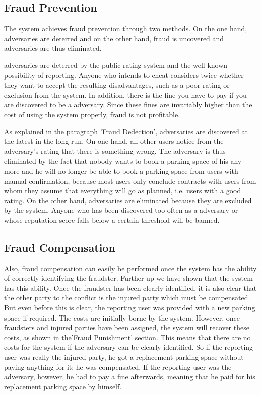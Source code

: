 \documentclass[
a4paper,     %
titlepage,   %
14pt         %
]{scrartcl}  %
\theoremstyle{mystyle}
\begin{document}
\subsection{Fraud Prevention}
The system achieves fraud prevention through two methods. On the one hand, adversaries are deterred and on the other hand, fraud is uncovered and adversaries are thus eliminated.

adversaries are deterred by the public rating system and the well-known possibility of reporting. Anyone who intends to cheat considers twice whether they want to accept the resulting disadvantages, such as a poor rating or exclusion from the system. In addition, there is the fine you have to pay if you are discovered to be a adversary. Since these fines are invariably higher than the cost of using the system properly, fraud is not profitable.

As explained in the paragraph 'Fraud Dedection', adversaries are discovered at the latest in the long run. On one hand, all other users notice from the adversary's rating that there is something wrong. The adversary is thus eliminated by the fact that nobody wants to book a parking space of his any more and he will no longer be able to book a parking space from users with manual confirmation, because most users only conclude contracts with users from whom they assume that everything will go as planned, i.e. users with a good rating. On the other hand, adversaries are eliminated because they are excluded by the system. Anyone who has been discovered too often as a adversary or whose reputation score falls below a certain threshold will be banned.

\subsection{Fraud Compensation}
Also, fraud compensation can easily be performed once the system has the ability of correctly identifying the fraudster. Further up we have shown that the system has this ability. Once the fraudster has been clearly identified, it is also clear that the other party to the conflict is the injured party which must be compensated. \\

But even before this is clear, the reporting user was provided with a new parking space if required. The costs are initially borne by the system. However, once fraudsters and injured parties have been assigned, the system will recover these costs, as shown in the'Fraud Punishment' section. This means that there are no costs for the system if the adversary can be clearly identified. So if the reporting user was really the injured party, he got a replacement parking space without paying anything for it; he was compensated. If the reporting user was the adversary, however, he had to pay a fine afterwards, meaning that he paid for his replacement parking space by himself.
\end{document}
